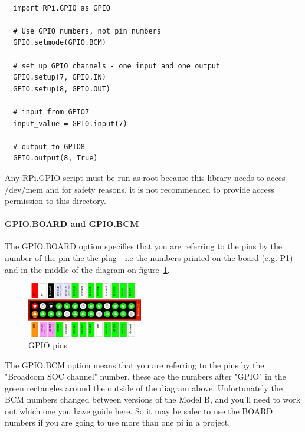\documentclass{acm_proc_article-sp}
\begin{document}
\renewcommand{\theFancyVerbLine}{
  \sffamily\textcolor[rgb]{0.5,0.5,0.5}{\scriptsize\arabic{FancyVerbLine}}}
\begin{verbatim}

  import RPi.GPIO as GPIO

  # Use GPIO numbers, not pin numbers
  GPIO.setmode(GPIO.BCM) 

  # set up GPIO channels - one input and one output
  GPIO.setup(7, GPIO.IN) 
  GPIO.setup(8, GPIO.OUT)

  # input from GPIO7
  input_value = GPIO.input(7)

  # output to GPIO8
  GPIO.output(8, True)
\end{verbatim}
Any RPi.GPIO script must be run as root because this library needs to acces /dev/mem and for safety reasons, it is not recommended to provide access permission to this directory.


\paragraph{GPIO.BOARD and GPIO.BCM}
The GPIO.BOARD option specifies that you are referring to the pins by the number of the pin the the plug - i.e the numbers printed on the board (e.g. P1) and in the middle of the diagram on figure~\ref{fig:ModelAB}.
\begin{figure}[h]
    \includegraphics[width=0.45\textwidth,natwidth=610,natheight=642]{pictures/ModelAB.png}
    \caption{GPIO pins}
    \label{fig:ModelAB}
\end{figure}
\newline
\newline
The GPIO.BCM option means that you are referring to the pins by the "Broadcom SOC channel" number, these are the numbers after "GPIO" in the green rectangles around the outside of the diagram above.
\newline
\newline
Unfortunately the BCM numbers changed between versions of the Model B, and you'll need to work out which one you have guide here. So it may be safer to use the BOARD numbers if you are going to use more than one pi in a project.
\end{document}
